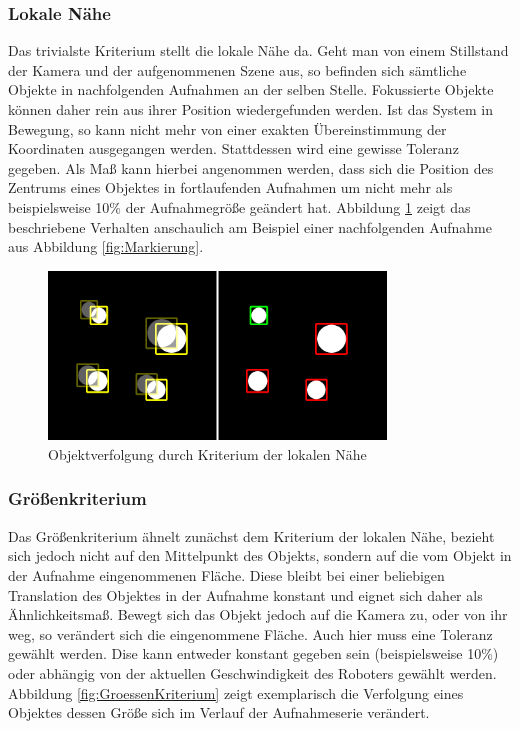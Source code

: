 \subsubsection{Lokale Nähe}
Das trivialste Kriterium stellt die lokale Nähe da. Geht man von einem Stillstand der Kamera und der aufgenommenen Szene aus, so befinden sich sämtliche Objekte in nachfolgenden Aufnahmen an der selben Stelle. Fokussierte Objekte können daher rein aus ihrer Position wiedergefunden werden. Ist das System in Bewegung, so kann nicht mehr von einer exakten Übereinstimmung der Koordinaten ausgegangen werden. Stattdessen wird eine gewisse Toleranz gegeben. Als Maß kann hierbei angenommen werden, dass sich die Position des Zentrums eines Objektes in fortlaufenden Aufnahmen um nicht mehr als beispielsweise 10\% der Aufnahmegröße geändert hat. Abbildung \ref{fig:LokaleNaehe} zeigt das beschriebene Verhalten anschaulich am Beispiel einer nachfolgenden Aufnahme aus Abbildung \ref{fig:Markierung}. 

\begin{figure}[h]
\centering
\includegraphics[width=0.8\textwidth]{Bilder/Workloop/MovingMarker}
\caption{Objektverfolgung durch Kriterium der lokalen Nähe}
\label{fig:LokaleNaehe}
\end{figure}

\subsubsection{Größenkriterium}
Das Größenkriterium ähnelt zunächst dem Kriterium der lokalen Nähe, bezieht sich jedoch nicht auf den Mittelpunkt des Objekts, sondern auf die vom Objekt in der Aufnahme eingenommenen Fläche. Diese bleibt bei einer beliebigen Translation des Objektes in der Aufnahme konstant und eignet sich daher als Ähnlichkeitsmaß. Bewegt sich das Objekt jedoch auf die Kamera zu, oder von ihr weg, so verändert sich die eingenommene Fläche. Auch hier muss eine Toleranz gewählt werden. Dise kann entweder konstant gegeben sein (beispielsweise 10\%) oder abhängig von der aktuellen Geschwindigkeit des Roboters gewählt werden. Abbildung \ref{fig:GroessenKriterium} zeigt exemplarisch die Verfolgung eines Objektes dessen Größe sich im Verlauf der Aufnahmeserie verändert.

